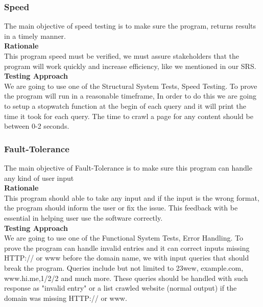 \documentclass[12pt, titlepage]{article}
\begin{document}
\subsubsection{Speed}
The main objective of speed testing is to make sure the program, returns results in a timely manner.\\

\textbf{Rationale}  \\

This program speed must be verified, we must assure stakeholders that the program will work quickly and increase efficiency, like we mentioned in our SRS.\\

\textbf{Testing Approach} \\ 

 We are going to use one of the Structural System Tests, Speed Testing. To prove the program will run in a reasonable timeframe, In order to do this we are going to setup a stopwatch function at the begin of each query and it will print the time it took for each query. The time to crawl a page for any content should be between 0-2 seconds.

\subsubsection{Fault-Tolerance}
The main objective of Fault-Tolerance is to make sure this program can handle any kind of user input\\

\textbf{Rationale}  \\

This program should able to take any input and if the input is the wrong format, the program should inform the user or fix the issue. This feedback with be essential in helping user use the software correctly.\\

\textbf{Testing Approach} \\ 

 We are going to use one of the  Functional System Tests, Error Handling. To prove the program can handle invalid entries and it can correct inputs missing HTTP:// or www before the domain name, we with input queries that should break the program. Queries include but not limited to 23wew, example.com, www.hi.me,1/2/2 and much more. These queries should be handled with such response as "invalid entry" or a list crawled website (normal output) if the domain was missing HTTP:// or www.
\end{document}
